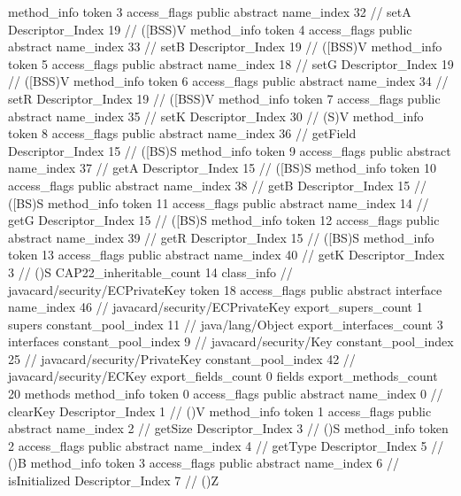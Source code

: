 {{{{{				}
				method_info {
					token	3
					access_flags	public abstract
					name_index	32		// setA
					Descriptor_Index	19		// ([BSS)V
				}
				method_info {
					token	4
					access_flags	public abstract
					name_index	33		// setB
					Descriptor_Index	19		// ([BSS)V
				}
				method_info {
					token	5
					access_flags	public abstract
					name_index	18		// setG
					Descriptor_Index	19		// ([BSS)V
				}
				method_info {
					token	6
					access_flags	public abstract
					name_index	34		// setR
					Descriptor_Index	19		// ([BSS)V
				}
				method_info {
					token	7
					access_flags	public abstract
					name_index	35		// setK
					Descriptor_Index	30		// (S)V
				}
				method_info {
					token	8
					access_flags	public abstract
					name_index	36		// getField
					Descriptor_Index	15		// ([BS)S
				}
				method_info {
					token	9
					access_flags	public abstract
					name_index	37		// getA
					Descriptor_Index	15		// ([BS)S
				}
				method_info {
					token	10
					access_flags	public abstract
					name_index	38		// getB
					Descriptor_Index	15		// ([BS)S
				}
				method_info {
					token	11
					access_flags	public abstract
					name_index	14		// getG
					Descriptor_Index	15		// ([BS)S
				}
				method_info {
					token	12
					access_flags	public abstract
					name_index	39		// getR
					Descriptor_Index	15		// ([BS)S
				}
				method_info {
					token	13
					access_flags	public abstract
					name_index	40		// getK
					Descriptor_Index	3		// ()S
				}
			}
			CAP22_inheritable_count	14
		}
		class_info {		// javacard/security/ECPrivateKey
			token	18
			access_flags	public abstract interface
			name_index	46		// javacard/security/ECPrivateKey
			export_supers_count	1
			supers {
				constant_pool_index	11		// java/lang/Object
			}
			export_interfaces_count	3
			interfaces {
				constant_pool_index	9		// javacard/security/Key
				constant_pool_index	25		// javacard/security/PrivateKey
				constant_pool_index	42		// javacard/security/ECKey
			}
			export_fields_count	0
			fields {
			}
			export_methods_count	20
			methods {
				method_info {
					token	0
					access_flags	public abstract
					name_index	0		// clearKey
					Descriptor_Index	1		// ()V
				}
				method_info {
					token	1
					access_flags	public abstract
					name_index	2		// getSize
					Descriptor_Index	3		// ()S
				}
				method_info {
					token	2
					access_flags	public abstract
					name_index	4		// getType
					Descriptor_Index	5		// ()B
				}
				method_info {
					token	3
					access_flags	public abstract
					name_index	6		// isInitialized
					Descriptor_Index	7		// ()Z
}}}}}

